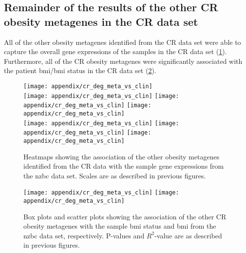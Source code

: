 \begin{appendices}
	\newpage

	\section{Remainder of the results of the other CR obesity metagenes in the CR data set}
	\label{sec:rest_of_the_cr_ob_meta_heatmap_results_cr}

	All of the other obesity metagenes identified from the CR data set were able to capture the overall gene expressions of the samples in the CR data set (\cref{fig:appendix/cr_ob_meta_heatmap_cris}).
	Furthermore, all of the CR obesity metagenes were significantly associated with the patient \gls{bmi}/\gls{bmi} status in the CR data set (\cref{fig:appendix/cr_ob_meta_box_scatter_cris}).

	\begin{figure}[htp!]
		\centering
		\texttt{[image: appendix/cr\_deg\_meta\_vs\_clin]}\\
		\texttt{[image: appendix/cr\_deg\_meta\_vs\_clin]}
		\texttt{[image: appendix/cr\_deg\_meta\_vs\_clin]}
		\texttt{[image: appendix/cr\_deg\_meta\_vs\_clin]}\\
		\texttt{[image: appendix/cr\_deg\_meta\_vs\_clin]}
		\texttt{[image: appendix/cr\_deg\_meta\_vs\_clin]}
		\texttt{[image: appendix/cr\_deg\_meta\_vs\_clin]}\\
		\caption[Association of the other CR obesity metagenes with the sample gene expressions in the \gls{nzbc} data]{Heatmaps showing the association of the other obesity metagenes identified from the CR data with the sample gene expressions from the \gls{nzbc} data set.
		Scales are as described in previous figures.}
		\label{fig:appendix/cr_ob_meta_heatmap_cris}
	\end{figure}

	\begin{figure}[h]
		\centering
		\texttt{[image: appendix/cr\_deg\_meta\_vs\_clin]}
		\hfill
		\texttt{[image: appendix/cr\_deg\_meta\_vs\_clin]}\\
		\caption[Association of the other CR obesity metagenes with the sample \gls{bmi}/\gls{bmi} status in the \gls{nzbc} data]{Box plots and scatter plots showing the association of the other CR obesity metagenes with the sample \gls{bmi} status  and \gls{bmi} from the \gls{nzbc} data set, respectively.
		P-values and $R^2$-value are as described in previous figures.}
		\label{fig:appendix/cr_ob_meta_box_scatter_cris}
	\end{figure}


\end{appendices}
